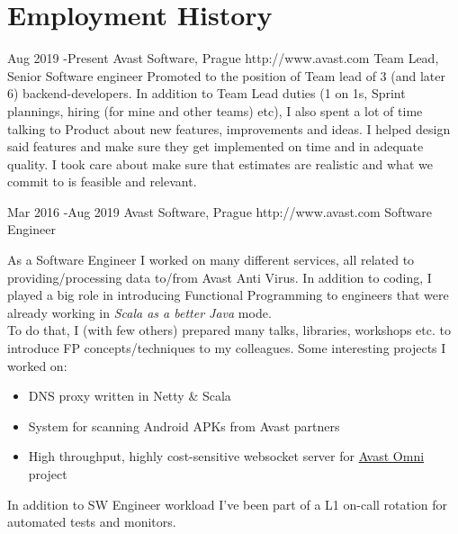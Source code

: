 \documentclass[10pt]{article} %
\begin{document}

\section{Employment History}

\job
{Aug 2019 -}{Present}
{Avast Software, Prague}
{http://www.avast.com}
{Team Lead, Senior Software engineer}
{Promoted to the position of Team lead of 3 (and later 6) backend-developers. In addition to Team Lead duties (1 on 1s, Sprint plannings, hiring (for mine and other teams) etc), I also spent a lot of time
talking to Product about new features, improvements and ideas. I helped design said features and make sure they get implemented on time and in adequate quality. I took care about make sure that
estimates are realistic and what we commit to is feasible and relevant. \\

}


\job
{Mar 2016 -}{Aug 2019}
{Avast Software, Prague}
{http://www.avast.com}
{Software Engineer}
{As a Software Engineer I worked on many different services, all related to providing/processing data to/from Avast Anti Virus. In addition to coding,
I played a big role in introducing Functional Programming to engineers that were already working in \emph{Scala as a better Java} mode. \\
To do that, I (with few others) prepared many talks, libraries, workshops etc. to introduce FP concepts/techniques to my colleagues. Some interesting projects I worked on:
\begin{itemize}
    \item DNS proxy written in Netty \& Scala
    \item System for scanning Android APKs from Avast partners
    \item High throughput, highly cost-sensitive websocket server for \href{https://www.avast.com/en-us/omni}{Avast Omni} project
\end{itemize}

In addition to SW Engineer workload I've been part of a L1 on-call rotation for automated tests and monitors.

}
\end{document}

